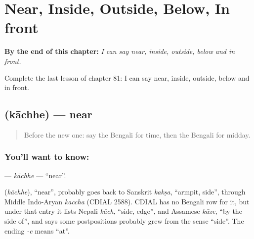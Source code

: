 
\chapter{Near, Inside, Outside, Below, In front}
\label{ch:bn-near-inside-outside-below-in-front}

\begin{chapteropening}
\textbf{By the end of this chapter:} \emph{I can say near, inside, outside, below and in front.}

Complete the last lesson of chapter 81: I can say near, inside, outside, below and in front.
\end{chapteropening}

\section[\texorpdfstring{\bn{কাছে} (kāchhe)}{কাছে (kāchhe)}]{ (kāchhe) — near}

\label{lesson:BN-C81-kachhe}



\begin{quote}
Before the new one: say the Bengali for time, then the Bengali for midday.
\end{quote}

\subsection*{You'll want to know: }
\textbf{} — \emph{kāchhe} — \textquotedblleft{}near\textquotedblright{}.

\begin{cousinweb}
\textbf{} (\emph{kāchhe}), \textquotedblleft{}near\textquotedblright{}, probably goes back to Sanskrit \emph{kakṣa}, \textquotedblleft{}armpit, side\textquotedblright{}, through Middle Indo-Aryan \emph{kaccha} (CDIAL 2588). CDIAL has no Bengali row for it, but under that entry it lists Nepali \emph{kāch}, \textquotedblleft{}side, edge\textquotedblright{}, and Assamese \emph{kāxe}, \textquotedblleft{}by the side of\textquotedblright{}, and says some postpositions probably grew from the sense \textquotedblleft{}side\textquotedblright{}. The ending \emph{-e} means \textquotedblleft{}at\textquotedblright{}.
\end{cousinweb}

